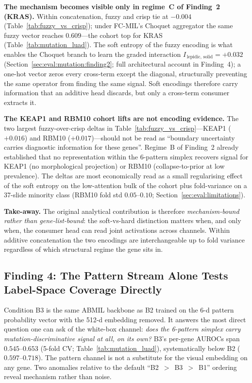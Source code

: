 \textbf{The mechanism becomes visible only in regime~C of
Finding~2 (KRAS).}
Within concatenation, fuzzy and crisp tie at $-0.004$
(Table~\ref{tab:fuzzy_vs_crisp}); under FC-MIL's Choquet
aggregator the same fuzzy vector reaches $0.609$---the cohort top
for KRAS (Table~\ref{tab:mutation_luad}).
The soft entropy of the fuzzy encoding is what enables the
Choquet branch to learn the graded interaction
$I_{\,\mathrm{lepidic,\,solid}} = +0.032$
(Section~\ref{sec:eval:mutation:finding2}; full architectural
account in Finding~4); a one-hot vector zeros every cross-term
except the diagonal, structurally preventing the same operator
from finding the same signal.
Soft encodings therefore carry information that an additive head
discards, but only a cross-term consumer extracts it.

\textbf{The KEAP1 and RBM10 cohort lifts are not encoding
evidence.}
The two largest fuzzy-over-crisp deltas in
Table~\ref{tab:fuzzy_vs_crisp}---KEAP1 ($+0.016$) and RBM10
($+0.017$)---should not be read as ``boundary uncertainty carries
diagnostic information for these genes''.
Regime~B of Finding~2 already established that no representation
within the 6-pattern simplex recovers signal for KEAP1 (no
morphological projection) or RBM10 (collapse-to-prior at low
prevalence).
The deltas are most economically read as a small regularising
effect of the soft entropy on the low-attention bulk of the cohort
plus fold-variance on a 37-slide minority class
(RBM10 fold std $0.05$--$0.10$; Section~\ref{sec:eval:limitations}).

\textbf{Take-away.}
The original analytical contribution is therefore
\emph{mechanism-bound rather than gene-list-bound}: the soft-vs-hard
distinction matters when, and only when, the consumer head can
read joint activations across channels.
Within additive concatenation the two encodings are
interchangeable up to fold variance regardless of which structural
regime the gene sits in.

\subsection{Finding 4: The Pattern Stream Alone Tests Label-Space
Coverage Directly}
\label{sec:eval:mutation:finding4}

Condition B3 is the same ABMIL backbone as B2 trained on the 6-d
pattern probability vector with the 512-d embedding removed.
It answers the most direct question one can ask of the white-box
channel: \emph{does the 6-pattern simplex carry
mutation-discriminative signal at all, on its own?}
B3's per-gene AUROCs span $0.545$--$0.653$ (5-fold CV;
Table~\ref{tab:mutation_luad}), systematically below B2
($0.597$--$0.718$).
The pattern channel is not a substitute for the visual embedding
on any gene.
Two anomalies relative to the default ``B2~$>$~B3~$>$~B1'' ordering
reveal mechanism rather than noise.

